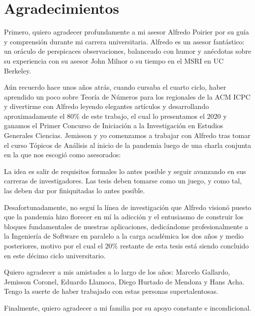 \chapter*{Agradecimientos}
\thispagestyle{empty}

\vspace{-0.5cm}

Primero, quiero agradecer profundamente a mi asesor Alfredo Poirier
por su guía y comprensión durante mi carrera universitaria.
Alfredo es un asesor fantástico:
un oráculo de perspicaces observaciones,
balanceado con humor
y anécdotas sobre su experiencia
con su asesor John Milnor
o su tiempo en el MSRI en UC Berkeley.

Aún recuerdo hace unos años atrás,
cuando cursaba el cuarto ciclo,
haber aprendido un poco sobre Teoría de Números
para los regionales de la ACM ICPC
y divertirme con Alfredo
leyendo elegantes artículos
y desarrollando aproximadamente el \(80\%\) de este trabajo,
el cual lo presentamos el \(2020\)
y ganamos el
Primer Concurso de Iniciación a la Investigación en Estudios Generales Ciencias.
Jemisson y yo comenzamos a trabajar con Alfredo
tras tomar el curso Tópicos de Análisis al inicio de la pandemia
luego de una charla conjunta en la que nos escogió como asesorados:

\begin{displayquote}
La idea es salir de requisitos formales lo antes posible
y seguir avanzando en sus carreras de investigadores.
Las tesis deben tomarse como un juego,
y como tal,
las deben dar por finiquitadas lo antes posible.
\end{displayquote}

Desafortunadamente,
no seguí la línea de investigación
que Alfredo visionó
puesto que la pandemia
hizo florecer en mí
la adicción y el entusiasmo de construir
los bloques fundamentales de nuestras aplicaciones,
dedicándome profesionalmente
a la Ingeniería de Software
en paralelo a la carga académica
los dos años y medio posteriores,
motivo por el cual el \(20\%\) restante de esta tesis
está siendo concluido en este décimo ciclo universitario.

Quiero agradecer a mis amistades a lo largo de los años:
Marcelo Gallardo,
Jemisson Coronel,
Eduardo Llamoca,
Diego Hurtado de Mendoza
y
Hans Acha.
Tengo la suerte de haber trabajado con estas personas supertalentosas.

Finalmente, quiero agradecer a mi familia por su apoyo constante e incondicional.
